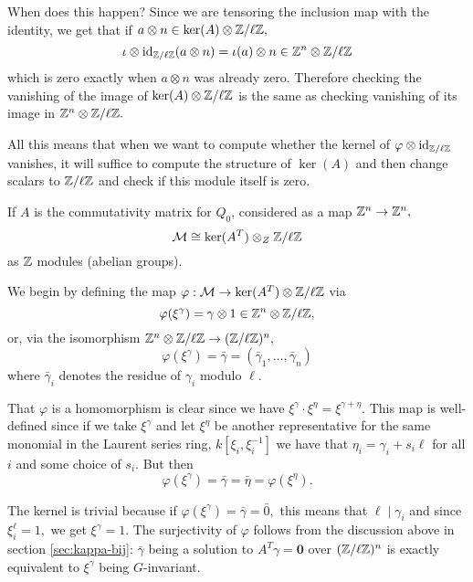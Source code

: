 \documentclass [11pt, proquest] {uwthesis}[2020/02/24]
\begin{document}
{\begin{rmk}
        When does this happen? Since we are tensoring the inclusion map with the identity, we get that if $a\otimes n\in\ker(A)\otimes\mathbb{Z}/\ell\mathbb{Z},$
        \[\iota\otimes\operatorname{id}_{\mathbb{Z}/\ell\mathbb{Z}}(a\otimes n)=\iota(a)\otimes n\in \mathbb{Z}^n\otimes\mathbb{Z}/\ell\mathbb{Z}\]
        which is zero exactly when $a\otimes n$ was already zero. Therefore checking the vanishing of the image of $\ker(A)\otimes\mathbb{Z}/\ell\mathbb{Z}$ is the same as checking vanishing of its image in $\mathbb{Z}^n\otimes\mathbb{Z}/\ell\mathbb{Z}.$
        
        All this means that when we want to compute whether the kernel of $\varphi\otimes\operatorname{id}_{\mathbb{Z}/\ell\mathbb{Z}}$ vanishes, it will suffice to compute the structure of $\ker(A)$ and then change scalars to $\mathbb{Z}/\ell\mathbb{Z}$ and check if this module itself is zero.
    \end{rmk}
    
    \begin{lem}\label{lem:kernel-AT}
        If $A$ is the commutativity matrix for $Q_0$, considered as a map $\mathbb{Z}^n\to \mathbb{Z}^n,$ 
        \[\mathcal{M} \cong \ker(A^T)\otimes_Z\mathbb{Z}/\ell\mathbb{Z}\]
        as $\mathbb{Z}$ modules (abelian groups).
    \end{lem}
    \begin{prf}
        We begin by defining the map $\varphi:\mathcal{M}\to\ker(A^T)\otimes\mathbb{Z}/\ell\mathbb{Z}$ via
        \[\varphi(\xi^\gamma)=\gamma\otimes 1\in \mathbb{Z}^n\otimes\mathbb{Z}/\ell\mathbb{Z},\]
        or, via the isomorphism $\mathbb{Z}^n\otimes\mathbb{Z}/\ell\mathbb{Z}\to (\mathbb{Z}/\ell\mathbb{Z})^n,$
        \[\varphi(\xi^\gamma)=\bar\gamma=(\bar\gamma_1,\dots,\bar\gamma_n)\]
        where $\bar\gamma_i$ denotes the residue of $\gamma_i$ modulo $\ell.$
        
        That $\varphi$ is a homomorphism is clear since we have $\xi^\gamma\cdot\xi^\eta=\xi^{\gamma+\eta}.$
        This map is well-defined since if we take $\xi^\gamma$ and let $\xi^\eta$ be another representative for the same monomial in the Laurent series ring, $k[\xi_i,\xi_i^{-1}]$ we have that $\eta_i=\gamma_i+s_i\ell$ for all $i$ and some choice of $s_i.$ But then
        \[\varphi(\xi^\gamma)=\bar\gamma=\bar\eta=\varphi(\xi^\eta).\]
        
        The kernel is trivial because if $\varphi(\xi^\gamma)=\bar\gamma=\bar 0,$ this means that $\ell\mid\gamma_i$ and since $\xi_i^\ell=1,$ we get $\xi^\gamma=1.$ The surjectivity of $\varphi$ follows from the discussion above in section \ref{sec:kappa-bij}: $\bar\gamma$ being a solution to $A^T\gamma=\mathbf 0$ over $(\mathbb{Z}/\ell\mathbb{Z})^n$ is exactly equivalent to $\xi^\gamma$ being $G$-invariant. 
    \end{prf}
    
}
\end{document}
